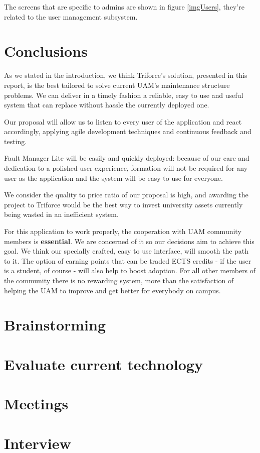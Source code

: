 \documentclass{report}
\begin{document}
The screens that are specific to admins are shown in figure \ref{imgUsers}, they're related to the user management subsystem.

\chapter{Conclusions}
\label{chapConclusions}

As we stated in the introduction, we think Triforce's solution, presented in this report, is the best tailored to solve current UAM's maintenance structure problems. We can deliver in a timely fashion a reliable, easy to use and useful system that can replace without hassle the currently deployed one.

Our proposal will allow us to listen to every user of the application and react accordingly, applying agile development techniques and continuous feedback and testing.

Fault Manager Lite will be easily and quickly deployed: because of our care and dedication to a polished user experience, formation will not be required for any user as the application and the system will be easy to use for everyone.

We consider the quality to price ratio of our proposal is high, and awarding the project to Triforce would be the best way to invest university assets currently being wasted in an inefficient system.

For this application to work properly, the cooperation with UAM community members is \textbf{essential}. We are concerned of it so our decisions aim to achieve this goal. We think our specially crafted, easy to use interface, will smooth the path to it. The option of earning points that can be traded ECTS credits - if the user is a student, of course - will also help to boost adoption. For all other members of the community there is no rewarding system, more than the satisfaction of helping the UAM to improve and get better for everybody on campus.

\appendix

\chapter{Brainstorming}
\label{chapBrainstorming}



\chapter{Evaluate current technology}
\label{chapCurrentTechnology}


\chapter{Meetings}
\label{chapMeetings}


\chapter{Interview}
\label{chapInterview}

\end{document}
